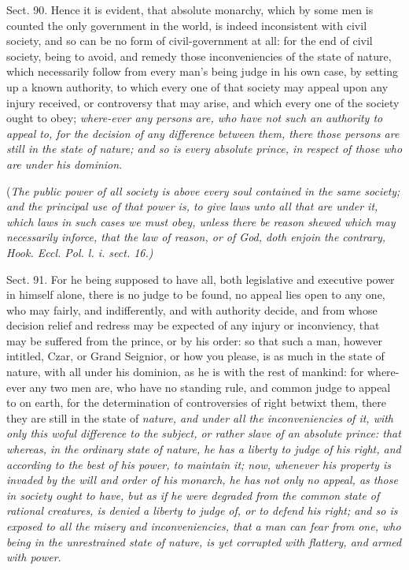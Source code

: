 \documentclass[11pt,openany]{book}
\begin{document}
Sect. 90. Hence it is evident, that absolute monarchy, which by some men is counted the only government in the world, is indeed inconsistent with civil society, and so can be no form of civil-government at all: for the end of civil society, being to avoid, and remedy those inconveniencies of the state of nature, which necessarily follow from every man's being judge in his own case, by setting up a known authority, to which every one of that society may appeal upon any injury received, or controversy that may arise, and which every one of the society ought to obey; \emph{where-ever any persons are, who have not such an authority to appeal to, for the decision of any difference between them, there those persons are still in the state of nature; and so is every absolute prince, in respect of those who are under his dominion}.

(\emph{The public power of all society is above every soul contained in the same society; and the principal use of that power is, to give laws unto all that are under it, which laws in such cases we must obey, unless there be reason shewed which may necessarily inforce, that the law of reason, or of God, doth enjoin the contrary, Hook. Eccl. Pol. l. i. sect. 16.)}

Sect. 91. For he being supposed to have all, both legislative and executive power in himself alone, there is no judge to be found, no appeal lies open to any one, who may fairly, and indifferently, and with authority decide, and from whose decision relief and redress may be expected of any injury or inconviency, that may be suffered from the prince, or by his order: so that such a man, however intitled, Czar, or Grand Seignior, or how you please, is as much in the state of nature, with all under his dominion, as he is with the rest of mankind: for where-ever any two men are, who have no standing rule, and common judge to appeal to on earth, for the determination of controversies of right betwixt them, there they are still in the state of \emph{nature, and under all the inconveniencies of it, with only this woful difference to the subject, or rather slave of an absolute prince: that whereas, in the ordinary state of nature, he has a liberty to judge of his right, and according to the best of his power, to maintain it; now, whenever his property is invaded by the will and order of his monarch, he has not only no appeal, as those in society ought to have, but as if he were degraded from the common state of rational creatures, is denied a liberty to judge of, or to defend his right; and so is exposed to all the misery and inconveniencies, that a man can fear from one, who being in the unrestrained state of nature, is yet corrupted with flattery, and armed with power}.
\end{document}
